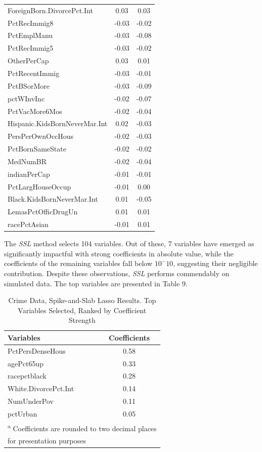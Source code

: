 \documentclass[
  11pt,
]{article}
\begin{document}
\begin{longtable}[t]{>{}l|>{}c|>{}c|}
\addlinespace
ForeignBorn.DivorcePct.Int & 0.03 & 0.03\\
PctRecImmig8 & -0.03 & -0.02\\
PctEmplManu & -0.03 & -0.08\\
PctRecImmig5 & -0.03 & -0.02\\
OtherPerCap & 0.03 & 0.01\\
\addlinespace
PctRecentImmig & -0.03 & -0.01\\
PctBSorMore & -0.03 & -0.09\\
pctWInvInc & -0.02 & -0.07\\
PctVacMore6Mos & -0.02 & -0.04\\
Hispanic.KidsBornNeverMar.Int & 0.02 & -0.03\\
\addlinespace
PersPerOwnOccHous & -0.02 & -0.03\\
PctBornSameState & -0.02 & -0.02\\
MedNumBR & -0.02 & -0.04\\
indianPerCap & -0.01 & -0.01\\
PctLargHouseOccup & -0.01 & 0.00\\
\addlinespace
Black.KidsBornNeverMar.Int & 0.01 & -0.05\\
LemasPctOfficDrugUn & 0.01 & 0.01\\
racePctAsian & -0.01 & 0.01\\*
\end{longtable}
\endgroup{}

The \emph{SSL} method selects 104 variables. Out of these, 7 variables
have emerged as significantly impactful with strong coefficients in
absolute value, while the coefficients of the remaining variables fall
below \(10^-10\), suggesting their negligible contribution. Despite
these observations, \emph{SSL} performs commendably on simulated data.
The top variables are presented in Table 9.

\begin{table}[H]

\caption{\label{tab:SSLASSO Results}Crime Data, Spike-and-Slab Lasso Results. Top Variables Selected, Ranked by Coefficient Strength}
\centering
\fontsize{10}{12}\selectfont
\begin{tabular}[t]{>{}l|c}
\toprule
\textbf{Variables} & \textbf{Coefficients}\\
\midrule
PctPersDenseHous & 0.58\\
agePct65up & 0.33\\
racepctblack & 0.28\\
White.DivorcePct.Int & 0.14\\
NumUnderPov & 0.11\\
\addlinespace
pctUrban & 0.05\\
\bottomrule
\multicolumn{2}{l}{\textsuperscript{a} Coefficients are rounded to two decimal places}\\
\multicolumn{2}{l}{for presentation purposes}\\
\end{tabular}
\end{table}
\end{document}
